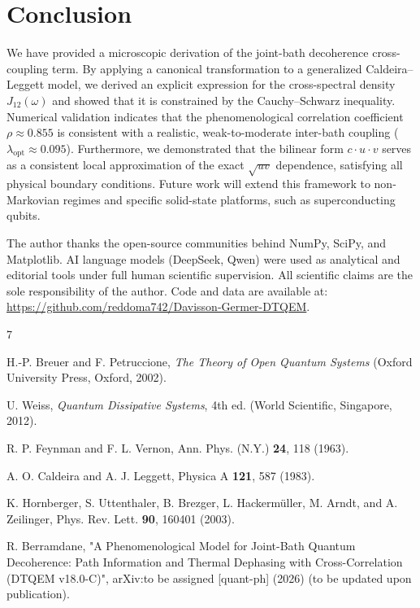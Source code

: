 \documentclass[aps,pra,reprint,amsmath,amssymb,superscriptaddress]{revtex4-2}
\begin{document}
\section{Conclusion}
We have provided a microscopic derivation of the joint-bath decoherence cross-coupling term. By applying a canonical transformation to a generalized Caldeira--Leggett model, we derived an explicit expression for the cross-spectral density $J_{12}(\omega)$ and showed that it is constrained by the Cauchy--Schwarz inequality. Numerical validation indicates that the phenomenological correlation coefficient $\rho \approx 0.855$ is consistent with a realistic, weak-to-moderate inter-bath coupling ($\lambda_{\text{opt}} \approx 0.095$). Furthermore, we demonstrated that the bilinear form $c \cdot u \cdot v$ serves as a consistent local approximation of the exact $\sqrt{uv}$ dependence, satisfying all physical boundary conditions. Future work will extend this framework to non-Markovian regimes and specific solid-state platforms, such as superconducting qubits.

\begin{acknowledgments}
The author thanks the open-source communities behind NumPy, SciPy, and Matplotlib. AI language models (DeepSeek, Qwen) were used as analytical and editorial tools under full human scientific supervision. All scientific claims are the sole responsibility of the author. Code and data are available at: \url{https://github.com/reddoma742/Davisson-Germer-DTQEM}.
\end{acknowledgments}

\begin{thebibliography}{7}

H.-P. Breuer and F. Petruccione, \textit{The Theory of Open Quantum Systems} (Oxford University Press, Oxford, 2002).

U. Weiss, \textit{Quantum Dissipative Systems}, 4th ed. (World Scientific, Singapore, 2012).

R. P. Feynman and F. L. Vernon, Ann. Phys. (N.Y.) \textbf{24}, 118 (1963).

A. O. Caldeira and A. J. Leggett, Physica A \textbf{121}, 587 (1983).

K. Hornberger, S. Uttenthaler, B. Brezger, L. Hackerm\"uller, M. Arndt, and A. Zeilinger, Phys. Rev. Lett. \textbf{90}, 160401 (2003).

R. Berramdane, "A Phenomenological Model for Joint-Bath Quantum Decoherence: Path Information and Thermal Dephasing with Cross-Correlation (DTQEM v18.0-C)", arXiv:to be assigned [quant-ph] (2026) (to be updated upon publication).

\end{thebibliography}
\end{document}
